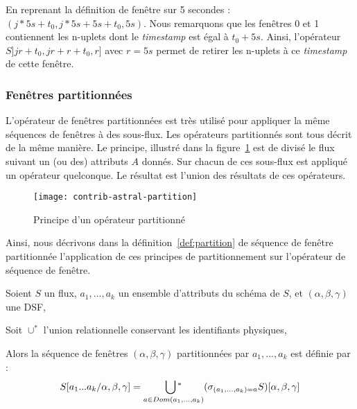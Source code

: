 \begin{example}
    En reprenant la définition de fenêtre sur 5 secondes : $(j*5s+t_0,j*5s+5s+t_0,5s)$. Nous remarquons que les fenêtres 0 et 1 contiennent les n-uplets dont le \textit{timestamp} est égal à $t_0+5s$. Ainsi, l'opérateur $S]jr+t_0,jr+r+t_0,r]$ avec $r=5s$ permet de retirer les n-uplets à ce \textit{timestamp} de cette fenêtre.
\end{example}

\subsubsection{Fenêtres partitionnées}
L'opérateur de fenêtres partitionnées est très utilisé pour appliquer la même séquences de fenêtres à des sous-flux. Les opérateurs partitionnés sont tous décrit de la même manière. Le principe, illustré dans la figure~\ref{fig:contrib:astral:partition} est de divisé le flux suivant un (ou des) attributs $A$ donnés. Sur chacun de ces sous-flux est appliqué un opérateur quelconque. Le résultat est l'union des résultats de ces opérateurs.

\begin{figure}[ht]
	\centering
	\texttt{[image: contrib-astral-partition]}
	\caption{Principe d'un opérateur partitionné}\label{fig:contrib:astral:partition}
\end{figure}

Ainsi, nous décrivons dans la définition~\ref{def:partition} de séquence de fenêtre partitionnée l'application de ces principes de partitionnement sur l'opérateur de séquence de fenêtre.
\begin{defi}\label{def:partition}
	Soient $S$ un flux, $a_1,...,a_k$ un ensemble d'attributs du schéma de $S$, et $(\alpha,\beta,\gamma)$ une DSF,
	
	Soit $\cup^*$ l'union relationnelle conservant les identifiants physiques, 

	Alors la séquence de fenêtres $(\alpha,\beta,\gamma)$ partitionnées par $a_1,...,a_k$ est définie par :
	$$S[a_1...a_k/\alpha,\beta,\gamma] = \mathop{\bigcup\null^*}_{a\in Dom(a_1,...,a_k)} (\sigma_{(a_1,...,a_k)=a} S)[\alpha,\beta,\gamma]$$
\end{defi}

